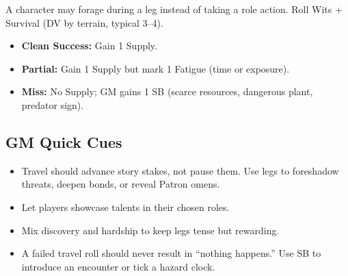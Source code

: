 A character may forage during a leg instead of taking a role action. Roll Wits + Survival (DV by terrain, typical 3–4).

\begin{itemize}
  \item \textbf{Clean Success:} Gain 1 Supply.
  \item \textbf{Partial:} Gain 1 Supply but mark 1 Fatigue (time or exposure).
  \item \textbf{Miss:} No Supply; GM gains 1 SB (scarce resources, dangerous plant, predator sign).
\end{itemize}

\subsection{GM Quick Cues}

\begin{itemize}
  \item Travel should advance story stakes, not pause them. Use legs to foreshadow threats, deepen bonds, or reveal Patron omens.
  \item Let players showcase talents in their chosen roles.
  \item Mix discovery and hardship to keep legs tense but rewarding.
  \item A failed travel roll should never result in ``nothing happens.'' Use SB to introduce an encounter or tick a hazard clock.
\end{itemize}
